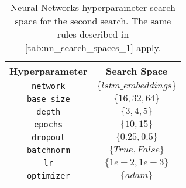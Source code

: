 \begin{table}[H]
    \centering
    \begin{tabular}{|c|c|}
        \hline

        \textbf{Hyperparameter} &
        \textbf{Search Space} \\

        \hline

        \texttt{network} &
        $\{lstm\_embeddings\}$ \\

        \hline

        \texttt{base\_size} &
        $\{16, 32, 64\}$ \\

        \hline

        \texttt{depth} &
        $\{3, 4, 5\}$ \\

        \hline

        \texttt{epochs} &
        $\{10, 15\}$ \\

        \hline

        \texttt{dropout} &
        $\{0.25, 0.5\}$ \\

        \hline

        \texttt{batchnorm} &
        $\{True, False\}$ \\

        \hline

        \texttt{lr} &
        $\{1e-2, 1e-3\}$ \\

        \hline

        \texttt{optimizer} &
        $\{adam\}$ \\

        \hline
    \end{tabular}
    \caption{Neural Networks hyperparameter 
    search space for the second search. 
    The same rules described in 
    \autoref{tab:nn_search_spaces_1} apply.}
    \label{tab:nn_search_spaces_2}
\end{table}